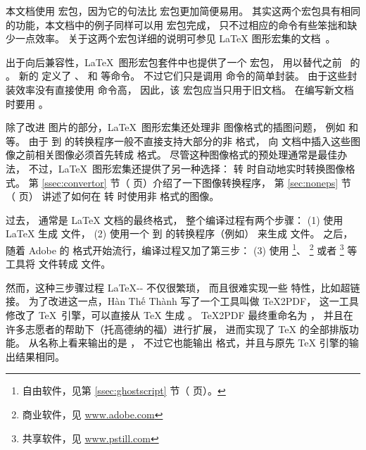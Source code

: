 本文档使用  宏包，因为它的句法比  宏包更加简便易用。
其实这两个宏包具有相同的功能，本文档中的例子同样可以用  宏包完成，
只不过相应的命令有些笨拙和缺少一点效率。
关于这两个宏包详细的说明可参见 \LaTeX{} 图形宏集的文档~\cite{grfguide}。

出于向后兼容性，\LaTeX\ 图形宏包套件中也提供了一个  宏包，
用以替代之前 \LaTeXe\ 的 。
新的 定义了 、 和  等命令。
不过它们只是调用  命令的简单封装。
由于这些封装效率没有直接使用  命令高，
因此，该  宏包应当只用于旧文档。
在编写新文档时要用 。

除了改进  图片的部分，\LaTeX{}~图形宏集还处理非  图像格式的插图问题，
例如 和 等。
由于  到  的转换程序一般不直接支持大部分的非 格式，
向  文档中插入这些图像之前相关图像必须首先转成  格式。
尽管这种图像格式的预处理通常是最佳办法，
不过，\LaTeX\ 图形宏集还提供了另一种选择： 转  时自动地实时转换图像格式。
第 \ref{ssec:convertor} 节（\pageref{ssec:convertor} 页）介绍了一下图像转换程序，
第 \ref{sec:noneps} 节（\pageref{sec:noneps} 页） 讲述了如何在  转  时使用非  格式的图像。

过去， 通常是 \LaTeX{} 文档的最终格式，
\marginpar{\pdfTeX}
整个编译过程有两个步骤：
(1) 使用 \LaTeX{} 生成  文件，
(2) 使用一个  到  的转换程序（例如） 来生成  文件。
之后，随着 Adobe 的  格式开始流行，编译过程又加了第三步：
(3) 使用 
\footnote{自由软件，见第 \ref{ssec:ghostscript} 节（\pageref{ssec:ghostscript} 页）。}、
\footnote{商业软件，见 \url{www.adobe.com}}
或者 
\footnote{共享软件，见 \url{www.pstill.com}}
等工具将  文件转成  文件。

然而，这种三步骤过程 \LaTeX-- 不仅很繁琐，
而且很难实现一些  特性，比如超链接。
为了改进这一点，Hàn Thế Thành 写了一个工具叫做 \TeX2PDF，
这一工具修改了 \TeX\ 引擎，可以直接从 \TeX{} 生成 。
\TeX2PDF 最终重命名为 \pdfTeX，
并且在许多志愿者的帮助下（托高德纳的福）进行扩展，
进而实现了 \TeX{} 的全部排版功能。
\pdfTeX 从名称上看来输出的是 ，
不过它也能输出  格式，并且与原先 \TeX{} 引擎的输出结果相同。


